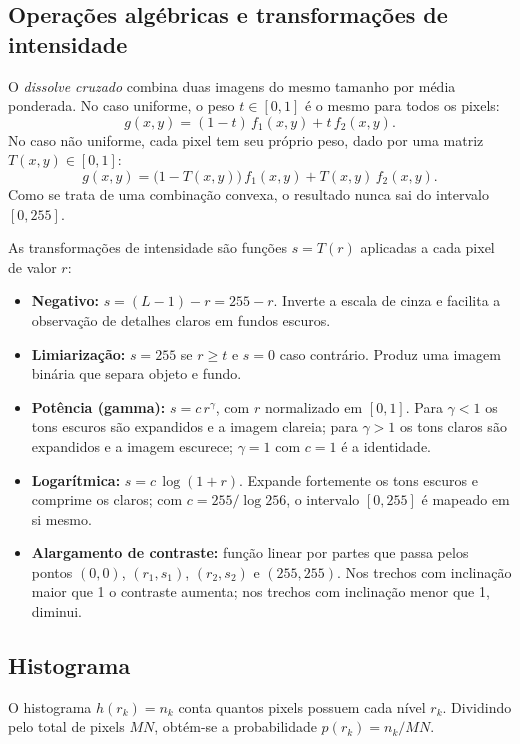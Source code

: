 \documentclass[11pt,a4paper]{article}
\begin{document}
\subsection{Operações algébricas e transformações de intensidade}

O \emph{dissolve cruzado} combina duas imagens do mesmo tamanho por média ponderada. No caso uniforme, o peso $t\in[0,1]$ é o mesmo para todos os pixels:
\begin{equation}
g(x,y) = (1-t)\,f_1(x,y) + t\,f_2(x,y).
\end{equation}
No caso não uniforme, cada pixel tem seu próprio peso, dado por uma matriz $T(x,y)\in[0,1]$:
\begin{equation}
g(x,y) = \big(1-T(x,y)\big)\,f_1(x,y) + T(x,y)\,f_2(x,y).
\end{equation}
Como se trata de uma combinação convexa, o resultado nunca sai do intervalo $[0,255]$.

As transformações de intensidade são funções $s = T(r)$ aplicadas a cada pixel de valor $r$:
\begin{itemize}
  \item \textbf{Negativo:} $s = (L-1) - r = 255 - r$. Inverte a escala de cinza e facilita a observação de detalhes claros em fundos escuros.
  \item \textbf{Limiarização:} $s = 255$ se $r \geq t$ e $s = 0$ caso contrário. Produz uma imagem binária que separa objeto e fundo.
  \item \textbf{Potência (gamma):} $s = c\,r^{\gamma}$, com $r$ normalizado em $[0,1]$. Para $\gamma<1$ os tons escuros são expandidos e a imagem clareia; para $\gamma>1$ os tons claros são expandidos e a imagem escurece; $\gamma=1$ com $c=1$ é a identidade.
  \item \textbf{Logarítmica:} $s = c\,\log(1+r)$. Expande fortemente os tons escuros e comprime os claros; com $c = 255/\log 256$, o intervalo $[0,255]$ é mapeado em si mesmo.
  \item \textbf{Alargamento de contraste:} função linear por partes que passa pelos pontos $(0,0)$, $(r_1,s_1)$, $(r_2,s_2)$ e $(255,255)$. Nos trechos com inclinação maior que 1 o contraste aumenta; nos trechos com inclinação menor que 1, diminui.
\end{itemize}

\subsection{Histograma}

O histograma $h(r_k) = n_k$ conta quantos pixels possuem cada nível $r_k$. Dividindo pelo total de pixels $MN$, obtém-se a probabilidade $p(r_k) = n_k / MN$.
\end{document}
